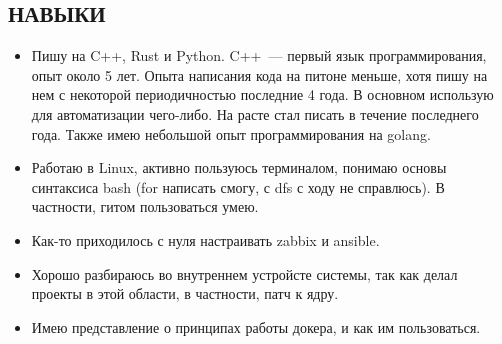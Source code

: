 \documentclass[margin, 10pt]{res} %
\begin{document}
\begin{resume}
\section{НАВЫКИ}
\begin{itemize}
	\item Пишу на C++, Rust и Python. C++~--- первый язык программирования, опыт около 5 лет. Опыта написания кода на питоне меньше, хотя пишу на нем с некоторой периодичностью последние 4 года. В основном использую для автоматизации чего-либо. На расте стал писать в течение последнего года. Также имею небольшой опыт программирования на golang.
	\item Работаю в Linux, активно пользуюсь терминалом, понимаю основы синтаксиса bash (for написать смогу, с dfs с ходу не справлюсь). В частности, гитом пользоваться умею.
	\item Как-то приходилось с нуля настраивать zabbix и ansible.
	\item Хорошо разбираюсь во внутреннем устройсте системы, так как делал проекты в этой области, в частности, патч к ядру.
	\item Имею представление о принципах работы докера, и как им пользоваться.
\end{itemize}

\end{resume}
\end{document}
